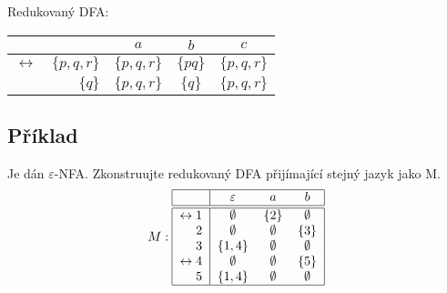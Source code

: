 \begin{multicols}{2}
    \raggedcolumns
    Redukovaný DFA:\\
    \begin{center}
        
    \begin{tabular}{|r r|c c c|}
        \hline
        & $ $ & $ a $ & $ b $ & $ c $ \\ \hline \hline
        $ \leftrightarrow $ & $\{p, q, r\}$ & $\{p, q, r\}$ & $\{pq\}$ & $\{p, q, r\}$ \\
        & $\{q\}$ & $\{p, q, r\}$ & $\{q\}$ & $\{p, q, r\}$ \\
        \hline
    \end{tabular}
    \end{center}

    
        


\end{multicols}

\subsection{Příklad}
Je dán $\varepsilon$-NFA. Zkonstruujte redukovaný DFA přijímající stejný jazyk jako M.
\[
M:
\begin{tabular}{|r|c c c|}
    \hline
    & $\varepsilon$ & $a$ & $b$\\
    \hline
    \hline
    $\leftrightarrow 1$& $\emptyset$ & $\{2\}$& $\emptyset$\\
    $2$                & $\emptyset$ & $\emptyset$& $\{3\}$\\
    $3$                & $\{1,4\}$ & $\emptyset$& $\emptyset$\\
    $\leftrightarrow 4$& $\emptyset$ & $\emptyset$& $\{5\}$\\
    $5$                & $\{1,4\}$ & $\emptyset$& $\emptyset$\\
    \hline
\end{tabular}
\]

